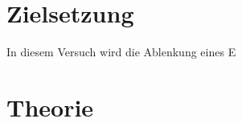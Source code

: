 \section{Zielsetzung}
\label{sec:Zielsetzung}

    In diesem Versuch wird die Ablenkung eines E

\section{Theorie}
\label{sec:Theorie}


